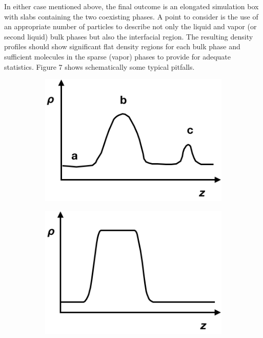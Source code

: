 \documentclass[9pt,bestpractices]{livecoms}
\begin{document}
In either case mentioned above, the final outcome is an elongated simulation
box with slabs containing the two coexisting phases. A point to consider is the
use of an appropriate number of particles to describe not only the liquid and
vapor (or second liquid) bulk phases but also the interfacial region. The
resulting density profiles should show significant flat density regions for
each bulk phase and sufficient molecules in the sparse (vapor) phases to
provide for adequate statistics. Figure 7 shows schematically some typical
pitfalls.

\begin{figure}
	\centering
	\begin{subfigure}{0.3\textwidth} %
    \includegraphics[width=1\textwidth]{gfx/image20.png}
	\end{subfigure}
	\begin{subfigure}{0.3\textwidth} %
    \includegraphics[width=1\textwidth]{gfx/image21.png}

\end{subfigure}
\end{figure}
\end{document}
